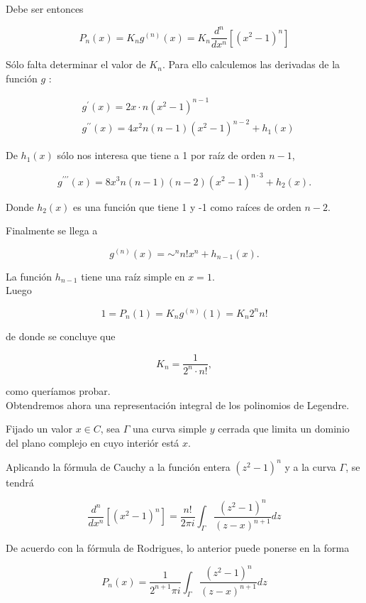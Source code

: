 \documentclass[10pt]{article}
\theoremstyle{plain}
\theoremstyle{definition}
\theoremstyle{remark}
\begin{document}
Debe ser entonces


\begin{equation*}
P_{n}(x)=K_{n} g^{(n)}(x)=K_{n} \frac{d^{n}}{d x^{n}}\left[\left(x^{2}-1\right)^{n}\right] \tag{9-5}
\end{equation*}


Sólo falta determinar el valor de $K_{n}$. Para ello calculemos las derivadas de la función $g$ :

$$
\begin{aligned}
& g^{\prime}(x)=2 x \cdot n\left(x^{2}-1\right)^{n-1} \\
& g^{\prime \prime}(x)=4 x^{2} n(n-1)\left(x^{2}-1\right)^{n-2}+h_{1}(x)
\end{aligned}
$$

De $h_{1}(x)$ sólo nos interesa que tiene a 1 por raíz de orden $n-1$,

$$
g^{\prime \prime \prime}(x)=8 x^{3} n(n-1)(n-2)\left(x^{2}-1\right)^{n \cdot 3}+h_{2}(x) .
$$

Donde $h_{2}(x)$ es una función que tiene 1 y -1 como raíces de orden $n-2$.

Finalmente se llega a

$$
g^{(n)}(x)=\sim^{n} n!x^{n}+h_{n-1}(x) .
$$

La función $h_{n-1}$ tiene una raíz simple en $x=1$.\\
Luego

$$
1=P_{n}(1)=K_{n} g^{(n)}(1)=K_{n} 2^{n} n!
$$


de donde se concluye que

$$
K_{n}=\frac{1}{2^{n} \cdot n!},
$$

como queríamos probar.\\
Obtendremos ahora una representación integral de los polinomios de Legendre.

Fijado un valor $x \in C$, sea $\Gamma$ una curva simple $y$ cerrada que limita un dominio del plano complejo en cuyo interiór está $x$.

Aplicando la fórmula de Cauchy a la función entera $\left(z^{2}-1\right)^{n}$ y a la curva $\Gamma$, se tendrá

$$
\frac{d^{n}}{d x^{n}}\left[\left(x^{2}-1\right)^{n}\right]=\frac{n!}{2 \pi i} \int_{\Gamma} \frac{\left(z^{2}-1\right)^{n}}{(z-x)^{n+1}} d z
$$

De acuerdo con la fórmula de Rodrigues, lo anterior puede ponerse en la forma


\begin{equation*}
P_{n}(x)=\frac{1}{2^{n+1} \pi i} \int_{\Gamma} \frac{\left(z^{2}-1\right)^{n}}{(z-x)^{n+1}} d z \tag{9.5}
\end{equation*}
\end{document}
